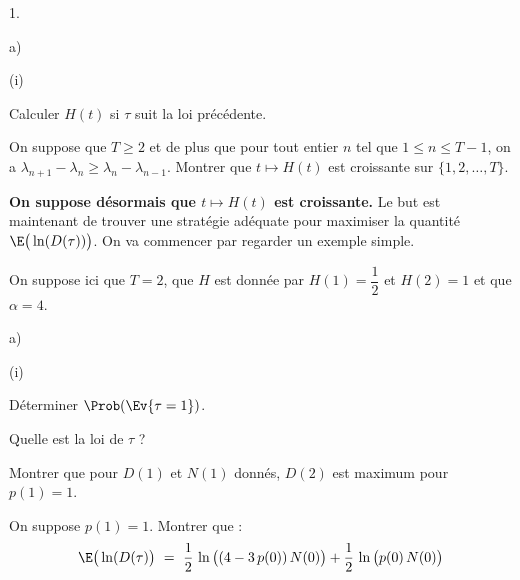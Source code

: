 \documentclass[11pt]{article}%
\begin{document}
\begin{noliste}{1.}
\begin{noliste}{a)}
\begin{nonoliste}{(i)}
      

      
      \item Calculer $H(t)$ si $\tau$ suit la loi précédente.
      
      
      
      

      
      \item On suppose que $T\geq 2$ et de plus que pour tout entier 
      $n$ tel que $1 \leq n \leq T-1$, on a $\lambda_{n+1} - 
      \lambda_n \geq \lambda_n - \lambda_{n-1}$. Montrer que 
      $t \mapsto H(t)$ est croissante sur $\{1,2, \ldots, T\}$.
      
      
    \end{nonoliste}
  \end{noliste}
  
  \noindent
  {\bf On suppose désormais que $t \mapsto H(t)$ est croissante.} Le 
  but est maintenant de trouver une stratégie adéquate pour maximiser 
  la quantité $\E\big(\ln(D(\tau))\big)$. On va commencer par regarder 
  un exemple simple.
  
  \item On suppose ici que $T=2$, que $H$ est donnée par $H(1) =
  \dfrac{1}{2}$ et $H(2)=1$ et que $\alpha=4$.
  \begin{noliste}{a)}
    \setlength{\itemsep}{2mm}
    \item 
    \begin{nonoliste}{(i)}
      \item Déterminer $\Prob(\Ev{\tau=1})$.
      
      
      
      

      
      \item Quelle est la loi de $\tau$ ?
      
      
    \end{nonoliste}
    
    \item Montrer que pour $D(1)$ et $N(1)$ donnés, $D(2)$ est maximum
    pour $p(1)=1$.
    
    

    
    \item On suppose $p(1)=1$. Montrer que :
    \[
      \E\big(\ln(D(\tau)\big) \ = \ \dfrac{1}{2} \, \ln\big((4-3 \, 
      p(0)) \, N(0)\big) + \dfrac{1}{2} \, \ln\big(p(0) \, N(0)\big)
    \]
    
    
    
    


\end{noliste}
\end{noliste}
\end{document}
